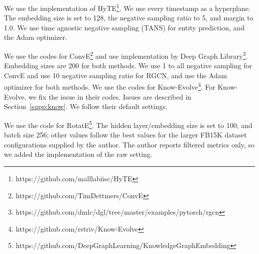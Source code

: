 \documentclass[11pt,a4paper]{article}
\begin{document}

We use the implementation of HyTE\footnote{\scriptsize https://github.com/malllabiisc/HyTE}.
We use every timestamp as a hyperplane. 
The embedding size is set to 128, the negative sampling ratio to 5, and margin to 1.0. 
We use time agnostic negative sampling (TANS) for entity prediction, and the Adam optimizer.

We use the codes for ConvE\footnote{\scriptsize https://github.com/TimDettmers/ConvE} and use implementation by Deep Graph Library\footnote{\scriptsize https://github.com/dmlc/dgl/tree/master/examples/pytorch/rgcn}. 
Embedding sizes are 200 for both methods.
We use 1 to all negative sampling for ConvE and use 10 negative sampling ratio for RGCN, and use the Adam optimizer for both methods.
We use the codes for Know-Evolve\footnote{\scriptsize https://github.com/rstriv/Know-Evolve}.
For Know-Evolve, we fix the issue in their codes. Issues are described in Section~\ref{supp:know}.
We follow their default settings.

We use the code for RotatE\footnote{\scriptsize https://github.com/DeepGraphLearning/KnowledgeGraphEmbedding}. The hidden layer/embedding size is set to 100, and batch size 256; other values follow the best values for the larger FB15K dataset configurations supplied by the author. The author reports filtered metrics only, so we added the implementation of the raw setting. 


\end{document}
